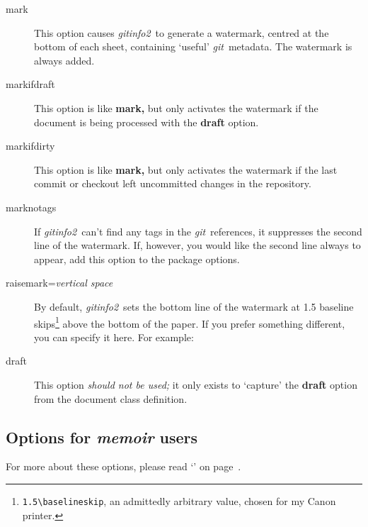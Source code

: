 \documentclass[a4paper,12pt,twoside,openany]{memoir}
\newcommand{\sfit}[1]{\textit{#1}}
\newcommand{\git}{\sfit{git}}
\newcommand{\tpname}{\sfit{gitinfo2}}
\begin{document}
\begin{description}

\item[mark]
This option causes \tpname\ to generate a watermark,
centred at the bottom of each sheet,
containing `useful' \git\ metadata.
The watermark is always added.

\item[markifdraft]
This option is like {\ttfamily\bfseries mark,}
but only activates the watermark if the document is being processed
with the {\ttfamily\bfseries draft} option.

\item[markifdirty]
This option is like {\ttfamily\bfseries mark,}
but only activates the watermark if the last commit or checkout left
uncommitted changes in the repository.

\item[marknotags]
If \tpname\ can't find any tags in the \git\ references,
it suppresses the second line of the watermark.
If, however, you would like the second line always to appear,
add this option to the package options.

\item[raisemark=\textit{vertical space}]
By default, \tpname\ sets the bottom line of the watermark
at 1.5 baseline
skips\footnote{\texttt{1.5\textbackslash{}baselineskip},
an admittedly arbitrary value, chosen for my Canon printer.}
above the bottom of the paper.
If you prefer something different,
you can specify it here.
For example:

\begin{quote}
{\ttfamily
[raisemark=0.95\textbackslash{}paperheight]
}
\end{quote}


\item[draft]
This option \emph{should not be used;} it only exists to `capture' the
{\ttfamily\bfseries draft} option from the document class definition.

\end{description}

\subsection{Options for \sfit{memoir} users}

For more about these options,
please read
`'
on page~\pageref*{sect:memuser}.
\end{document}
